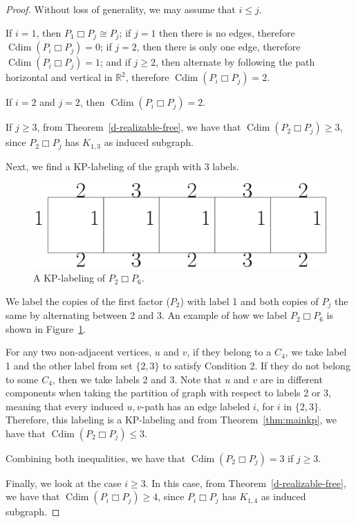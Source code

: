 \documentclass[12pt,a4paper,titlepage,openany]{report}
\DeclareMathOperator{\Cdim}{Cdim}
\begin{document}
\begin{proof}

 Without loss of generality, we may assume that $i\leq j$.

 If $i=1$, then $P_1 \Box P_j\cong P_j$; if $j=1$ then there is no edges, therefore $\Cdim(P_i \Box P_j)=0$; if $j=2$, then there is only one edge, therefore $\Cdim(P_i \Box P_j)=1$; and if $j\geq 2$, then alternate by following the path horizontal and vertical in $\mathbb{R}^2$, therefore \hbox{$\Cdim(P_i \Box P_j)=2$}.

 If $i=2$ and $j=2$, then $\Cdim(P_i \Box P_j)=2$.

If $j\geq 3$, from Theorem~\ref{d-realizable-free}, we have that $\Cdim(P_2 \Box P_j)\geq 3$, since $P_2 \Box P_j$ has $K_{1,3}$ as induced subgraph.

Next, we find a KP-labeling of the graph with 3 labels.
\begin{figure}[h]
\begin{center}
\includegraphics[width=0.6\linewidth]{figures/p_2sqp_j.png}
\end{center}
\caption{A KP-labeling of $P_2 \Box P_6$.}\label{fig:P_2sqP_6}
\end{figure}

We label the copies of the first factor ($P_2$) with label 1 and both copies of $P_j$ the same by alternating between 2 and 3.
An example of how we label $P_2 \Box P_6$ is shown in Figure~\ref{fig:P_2sqP_6}.

For any two non-adjacent vertices, $u$ and $v$, if they belong to a $C_4$, we take label 1 and the other label from set $\{2,3\}$ to satisfy Condition 2. If they do not belong to some $C_4$, then we take labels 2 and 3. Note that $u$ and $v$ are in different components when taking the partition of graph with respect to labels 2 or 3, meaning that every induced $u,v$-path has an edge labeled $i$, for $i$ in $\{2,3\}$. Therefore, this labeling is a KP-labeling and from Theorem~\ref{thm:mainkp}, we have that $\Cdim(P_2 \Box P_j)\leq 3$.

Combining both inequalities, we have that $\Cdim(P_2 \Box P_j)=3$ if $j\geq 3$.

Finally, we look at the case $i\geq 3$. In this case, from Theorem~\ref{d-realizable-free}, we have that $\Cdim(P_i \Box P_j)\geq 4$, since $P_i \Box P_j$ has $K_{1,4}$ as induced subgraph.


\end{proof}
\end{document}
